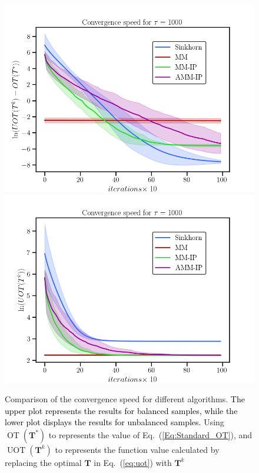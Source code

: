 \documentclass[a4paper,twocolumn]{article}
\newcommand{\mat}[1]{\mathbf{#1}}
\newcommand{\changeSX}[1]{\textcolor{black}{#1}}
\begin{document}
\begin{figure}[t]
\centering
\includegraphics[width = 0.99\linewidth]{pic/ex1}
\centering
\includegraphics[width = 0.99\linewidth]{pic/ex3}
\caption{Comparison of the convergence speed for different algorithms. \changeSX{The upper plot represents the results for balanced samples, while the lower plot displays the results for unbalanced samples.} Using $\operatorname{OT}(\mat T^{*})$ to represents the value of {Eq.~(\ref{Eq:Standard_OT})}, and $\operatorname{UOT}(\mat T^{k})$ to represents the function value calculated by replacing the optimal $\mat T$ in {Eq.~(\ref{eq:uot})} with $\mat T^{k}$ }
\label{Fig:ex1}
\end{figure}
\end{document}
